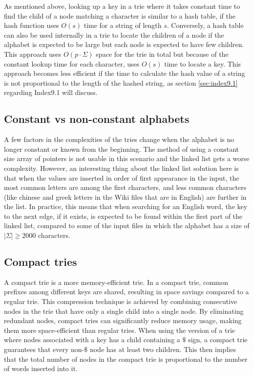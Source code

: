 As mentioned above, looking up a key in a trie where it takes constant time to find the child of a node matching a character is similar to a hash table, if the hash function uses $O(s)$ time for a string of length $s$. Conversely, a hash table can also be used internally in a trie to locate the children of a node if the alphabet is expected to be large but each node is expected to have few children. This approach uses $O(p\cdot\Sigma)$ space for the trie in total but because of the constant lookup time for each character, uses $O(s)$ time to locate a key. This approach becomes less efficient if the time to calculate the hash value of a string is not proportional to the length of the hashed string, as section \ref{sec:index9.1} regarding Index9.1 will discuss. 


\subsection{Constant vs non-constant alphabets}

A few factors in the complexities of the tries change when the alphabet is no longer constant or known from the beginning. The method of using a constant size array of pointers is not usable in this scenario and the linked list gets a worse complexity. However, an interesting thing about the linked list solution here is that when the values are inserted in order of first appearance in the input, the most common letters are among the first characters, and less common characters (like chinese and greek letters in the Wiki files that are in English) are further in the list. In practice, this means that when searching for an English word, the key to the next edge, if it exists, is expected to be found within the first part of the linked list, compared to some of the input files in which the alphabet has a size of $|\Sigma|\geq2000$ characters. 



\subsection{Compact tries}\label{sec:compact_tries}
A compact trie is a more memory-efficient trie. In a compact trie, common prefixes among different keys are shared, resulting in space savings compared to a regular trie. This compression technique is achieved by combining consecutive nodes in the trie that have only a single child into a single node. By eliminating redundant nodes, compact tries can significantly reduce memory usage, making them more space-efficient than regular tries. When using the version of a trie where nodes associated with a key has a child containing a $\$$ sign, a compact trie guarantees that every non-$\$$ node has at least two children. This then implies that the total number of nodes in the compact trie is proportional to the number of words inserted into it. 

